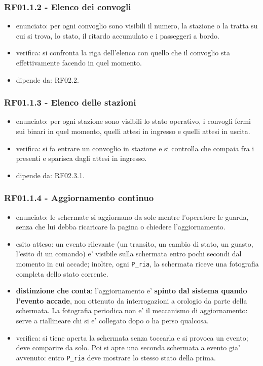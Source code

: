 \documentclass[11pt]{article}
\begin{document}
\subsubsection{RF01.1.2 - Elenco dei convogli}
\label{sec:orgc866f9b}
\begin{itemize}
\item enunciato: per ogni convoglio sono visibili il numero, la stazione o la tratta su cui si trova, lo
stato, il ritardo accumulato e i passeggeri a bordo.
\item verifica: si confronta la riga dell'elenco con quello che il convoglio sta effettivamente facendo
in quel momento.
\item dipende da: RF02.2.
\end{itemize}
\subsubsection{RF01.1.3 - Elenco delle stazioni}
\label{sec:orga4bb1c7}
\begin{itemize}
\item enunciato: per ogni stazione sono visibili lo stato operativo, i convogli fermi sui binari in quel
momento, quelli attesi in ingresso e quelli attesi in uscita.
\item verifica: si fa entrare un convoglio in stazione e si controlla che compaia fra i presenti e sparisca
dagli attesi in ingresso.
\item dipende da: RF02.3.1.
\end{itemize}
\subsubsection{RF01.1.4 - Aggiornamento continuo}
\label{sec:org039e63b}
\begin{itemize}
\item enunciato: le schermate si aggiornano da sole mentre l'operatore le guarda, senza che lui debba
ricaricare la pagina o chiedere l'aggiornamento.
\item esito atteso: un evento rilevante (un transito, un cambio di stato, un guasto, l'esito di un
comando) e' visibile sulla schermata entro pochi secondi dal momento in cui accade; inoltre, ogni
\texttt{P\_ria}, la schermata riceve una fotografia completa dello stato corrente.
\item \textbf{distinzione che conta}: l'aggiornamento e' \textbf{spinto dal sistema quando l'evento accade}, non
ottenuto da interrogazioni a orologio da parte della schermata. La fotografia periodica non e' il
meccanismo di aggiornamento: serve a riallineare chi si e' collegato dopo o ha perso qualcosa.
\item verifica: si tiene aperta la schermata senza toccarla e si provoca un evento; deve comparire da
solo. Poi si apre una seconda schermata a evento gia' avvenuto: entro \texttt{P\_ria} deve mostrare lo
stesso stato della prima.
\end{itemize}
\end{document}
